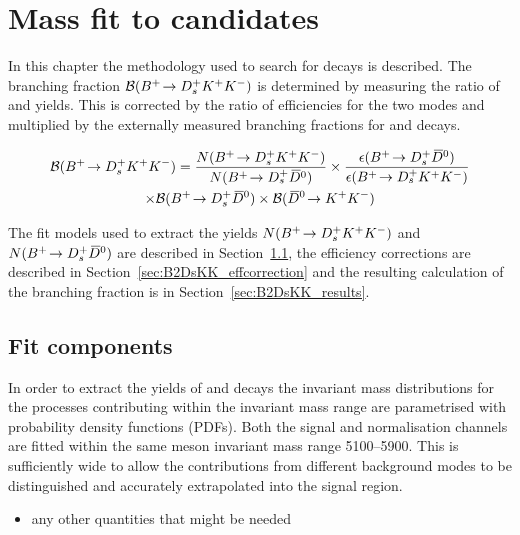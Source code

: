\chapter{Mass fit to \decay{\Bp}{\Dsp\Kp\Km} candidates} 
\label{ch:B2DsKK}

\minitoc

In this chapter the methodology used to search for \decay{\Bp}{\Dsp\Kp\Km} decays is described.
The branching fraction ${\mathcal{B}}({{{B}^+}}\!\rightarrow {\ensuremath{{D}^+_{s}}}{\ensuremath{{K}^+}}{\ensuremath{{K}^-}})$ is determined by measuring the ratio of \decay{\Bp}{\Dsp\Kp\Km} and \decay{\Bp}{\Dsp\Dzb} yields. 
This is corrected by the ratio of efficiencies for the two modes and multiplied by the externally measured branching fractions for \decay{\Bp}{\Dsp\Dzb} and \decay{\Dzb}{\Kp\Km} decays.

\begin{multline}
\BF(\decay{\Bp}{\Dsp\Kp\Km}) = \frac{N(\decay{\Bp}{\Dsp\Kp\Km})}{N(\decay{\Bp}{\Dsp\Dzb})} \times  \frac{\epsilon(\decay{\Bp}{\Dsp\Dzb})}{\epsilon(\decay{\Bp}{\Dsp\Kp\Km})}\\ 
\times \BF(\decay{\Bp}{\Dsp\Dzb}) \times \BF(\decay{\Dzb}{\Kp\Km}) 
\end{multline}

The fit models used to extract the yields $N({{{B}^+}}\!\rightarrow {\ensuremath{{D}^+_{s}}}{\ensuremath{{K}^+}}{\ensuremath{{K}^-}})$ and $N({{{B}^+}}\!\rightarrow {\ensuremath{{D}^+_{s}}}{\ensuremath{{\kern 0.2em\overline{\kern -0.2em D}{}}{}^0}})$ are described in Section~\ref{sec:B2DsKK_fitcomps}, the efficiency corrections are described in Section~\ref{sec:B2DsKK_effcorrection} and the resulting calculation of the branching fraction is in Section~\ref{sec:B2DsKK_results}.


\section{Fit components}
\label{sec:B2DsKK_fitcomps}

In order to extract the yields of \decay{\Bp}{\Dsp\Dzb} and \decay{\Bp}{\Dsp\Kp\Km} decays the invariant mass distributions for the processes contributing within the invariant mass range are parametrised with probability density functions (PDFs).
Both the signal and normalisation channels are fitted within the same \Bp meson invariant mass range 5100--5900\mevcc. This is sufficiently wide to allow the contributions from different background modes to be distinguished and accurately extrapolated into the signal region.  

{\color{Red}
\begin{itemize}
\item any other quantities that might be needed
\end{itemize}
}


